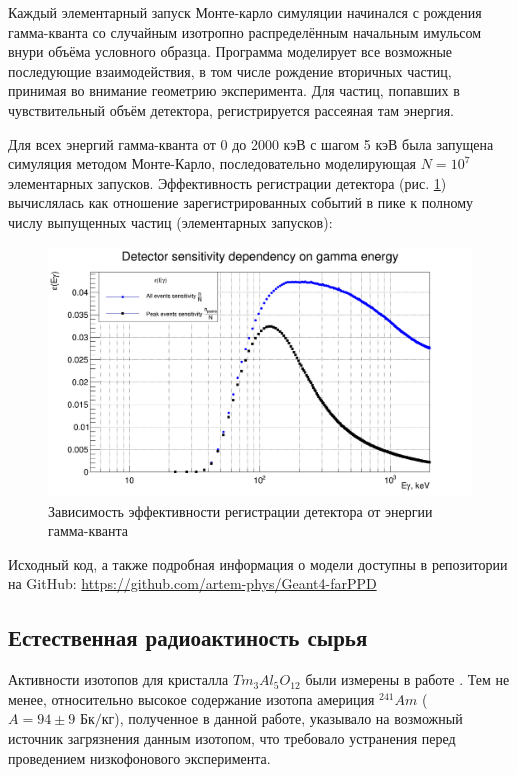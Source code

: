 \documentclass[a4paper,article,14pt]{extarticle}
\begin{document}
Каждый элементарный запуск Монте-карло симуляции начинался с рождения гамма-кванта со случайным изотропно распределённым начальным имульсом внури объёма условного образца. Программа моделирует все возможные последующие взаимодействия, в том числе рождение вторичных частиц, принимая во внимание геометрию эксперимента. Для частиц, попавших в чувствительный объём детектора, регистрируется рассеяная там энергия.

Для всех энергий гамма-кванта от 0 до 2000 кэВ с шагом 5 кэВ была запущена симуляция методом Монте-Карло, последовательно моделирующая $N = 10^7$ элементарных запусков. Эффективность регистрации детектора (рис. \ref{Ey}) вычислялась как отношение зарегистрированных событий в пике к полному числу выпущенных частиц (элементарных запусков):

\begin{figure}[h]
    \centering
    \includegraphics[width = 0.85 \textwidth]{images/DetSens.png}
    \caption{Зависимость эффективности регистрации детектора от энергии гамма-кванта}
    \label{Ey}
\end{figure}

Исходный код, а также подробная информация о модели доступны в репозитории на GitHub: \hyperlink{https://github.com/artem-phys/Geant4-farPPD}{https://github.com/artem-phys/Geant4-farPPD}


\subsection{Естественная радиоактиность сырья}

Активности изотопов для кристалла $Tm_3Al_5O_{12}$ были измерены в работе \cite{test_bolometric_tm}. Тем не менее, относительно высокое содержание изотопа америция $^{241}Am$ ($A = 94 \pm 9 \text{ Бк} / \text{кг}$), полученное в данной работе, указывало на возможный источник загрязнения данным изотопом, что требовало устранения перед проведением низкофонового эксперимента.
\end{document}
